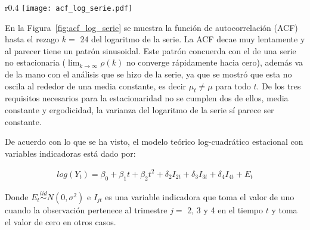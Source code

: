 \documentclass[11pt, letterpaper, twoside]{article}
\begin{document}


\begin{wrapfigure}{r}{0.4\textwidth}
  \vspace{-20pt}
  \centering
  \texttt{[image: acf\_log\_serie.pdf]}
  \caption{ACF del logaritmo de la serie, hasta el rezago $k=$ 24.}
  \label{fig:acf_log_serie}
\end{wrapfigure}


En la Figura~\ref{fig:acf_log_serie} se muestra la función de autocorrelación (ACF) hasta el rezago $k=$ 24 del logaritmo de la serie. La ACF decae muy lentamente y al parecer tiene un patrón sinusoidal. Este patrón concuerda con el de una serie no estacionaria ($\lim_{k\to\infty} \rho(k)$ no converge rápidamente hacia cero), además va de la mano con el análisis que se hizo de la serie, ya que se mostró que esta no oscila al rededor de una media constante, es decir $\mu_t \neq \mu$ para todo $t$. De los tres requisitos necesarios para la estacionaridad no se cumplen dos de ellos, media constante y ergodicidad, la varianza del logaritmo de la serie sí parece ser constante.

De acuerdo con lo que se ha visto, el modelo teórico log-cuadrático estacional con variables indicadoras está dado por:

\begin{align}
    \label{eq:mod_teo}
    log(Y_t)=\beta_0 + \beta_1 t + \beta_2 t^2 + \delta_2 I_{2t} + \delta_3 I_{3t} + \delta_4 I_{4t} + E_t
\end{align}

Donde $E_t \overset{iid}{\sim} N(0,\sigma^2)$ e $I_{jt}$ es una variable indicadora que toma el valor de uno cuando la observación pertenece al trimestre $j=$ 2, 3 y 4 en el tiempo $t$ y toma el valor de cero en otros casos.
\end{document}
